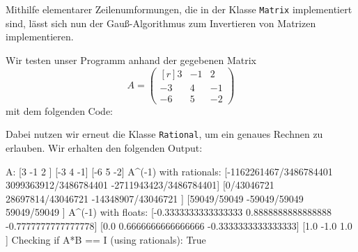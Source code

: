 \section{}

Mithilfe elementarer Zeilenumformungen, die in der Klasse \texttt{Matrix} implementiert sind, lässt sich nun der Gauß-Algorithmus zum Invertieren von Matrizen implementieren.



Wir testen unser Programm anhand der gegebenen Matrix
\[
  A
  = \begin{pmatrix*}[r]
       3  & -1  &  2  \\
      -3  &  4  & -1  \\
      -6  &  5  & -2
    \end{pmatrix*}
\]
mit dem folgenden Code:



Dabei nutzen wir erneut die Klasse \texttt{Rational}, um ein genaues Rechnen zu erlauben.
Wir erhalten den folgenden Output:

\begin{consoleoutput}
A:
[3  -1 2 ]
[-3 4  -1]
[-6 5  -2]
A^(-1) with rationals:
[-1162261467/3486784401 3099363912/3486784401 -2711943423/3486784401]
[0/43046721             28697814/43046721     -14348907/43046721    ]
[59049/59049            -59049/59049          59049/59049           ]
A^(-1) with floats:
[-0.3333333333333333 0.8888888888888888 -0.7777777777777778]
[0.0                 0.6666666666666666 -0.3333333333333333]
[1.0                 -1.0               1.0                ]
Checking if A*B == I (using rationals):
True
\end{consoleoutput}
